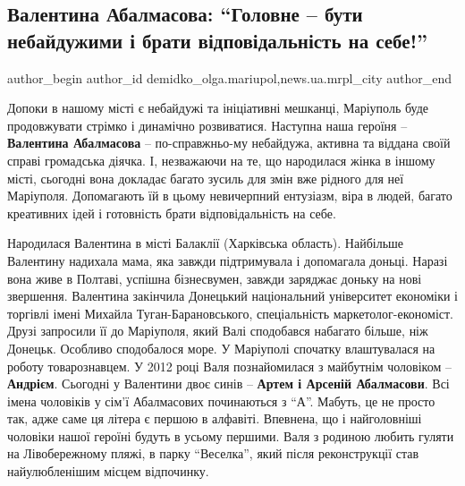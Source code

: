  
 
 
 
 
 
\subsection{Валентина Абалмасова: \enquote{Головне – бути небайдужими і брати відповідальність на себе!}}
\label{sec:18_08_2019.stz.news.ua.mrpl_city.1.valentyna_abalmasova}
 
\ifcmt
 author_begin
   author_id demidko_olga.mariupol,news.ua.mrpl_city
 author_end
\fi


Допоки в нашому місті є небайдужі та ініціативні мешканці, Маріуполь буде
продовжувати стрімко і динамічно розвиватися. Наступна наша героїня – \textbf{Валентина
Абалмасова} – по-справжньо\hyp{}му небайдужа, активна та віддана своїй справі
громадська діячка. І, незважаючи на те, що народилася жінка в іншому місті,
сьогодні вона докладає багато зусиль для змін вже рідного для неї Маріуполя.
Допомагають їй в цьому невичерпний ентузіазм, віра в людей, багато креативних
ідей і готовність брати відповідальність на себе.


Народилася Валентина в місті Балаклії (Харківська область). Найбільше Валентину
надихала мама, яка завжди підтримувала і допомагала доньці. Наразі вона живе в
Полтаві, успішна бізнесвумен, завжди заряджає доньку на нові звершення.
Валентина закінчила Донецький національний університет економіки і торгівлі
імені Михайла Туган-Барановського, спеціальність маркетолог-економіст. Друзі
запросили її до Маріуполя, який Валі сподобався набагато більше, ніж Донецьк.
Особливо сподобалося море. У Маріуполі спочатку влаштувалася на роботу
товарознавцем. У 2012 році Валя познайомилася з майбутнім чоловіком – \textbf{Андрієм}.
Сьогодні у Валентини двоє синів – \textbf{Артем і Арсеній Абалмасови}. Всі імена
чоловіків у сім'ї Абалмасових починаються з \enquote{А}. Мабуть, це не просто так, адже
саме ця літера є першою в алфавіті. Впевнена, що і найголовніші чоловіки нашої
героїні будуть в усьому першими. Валя з родиною любить гуляти на Лівобережному
пляжі, в парку \enquote{Веселка}, який після реконструкції став найулюбленішим місцем
відпочинку.


